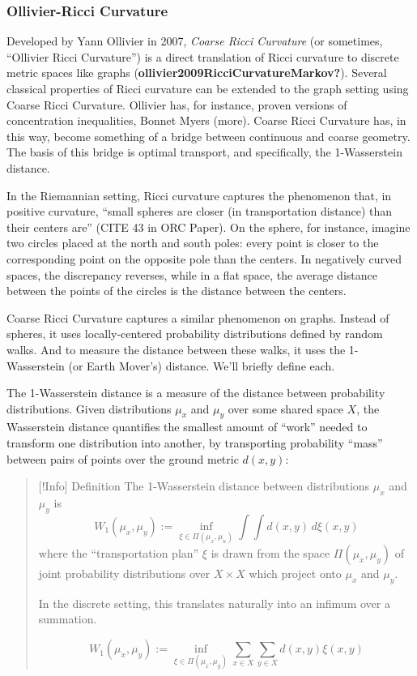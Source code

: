 \documentclass[
  letterpaper,
  DIV=11,
  numbers=noendperiod]{scrartcl}
\begin{document}
\subsubsection{Ollivier-Ricci Curvature}\label{ollivier-ricci-curvature}

Developed by Yann Ollivier in 2007, \emph{Coarse Ricci Curvature} (or
sometimes, ``Ollivier Ricci Curvature'') is a direct translation of
Ricci curvature to discrete metric spaces like graphs
(\textbf{ollivier2009RicciCurvatureMarkov?}). Several classical
properties of Ricci curvature can be extended to the graph setting using
Coarse Ricci Curvature. Ollivier has, for instance, proven versions of
concentration inequalities, Bonnet Myers (more). Coarse Ricci Curvature
has, in this way, become something of a bridge between continuous and
coarse geometry. The basis of this bridge is optimal transport, and
specifically, the 1-Wasserstein distance.

In the Riemannian setting, Ricci curvature captures the phenomenon that,
in positive curvature, ``small spheres are closer (in transportation
distance) than their centers are'' (CITE 43 in ORC Paper). On the
sphere, for instance, imagine two circles placed at the north and south
poles: every point is closer to the corresponding point on the opposite
pole than the centers. In negatively curved spaces, the discrepancy
reverses, while in a flat space, the average distance between the points
of the circles is the distance between the centers.

Coarse Ricci Curvature captures a similar phenomenon on graphs. Instead
of spheres, it uses locally-centered probability distributions defined
by random walks. And to measure the distance between these walks, it
uses the 1-Wasserstein (or Earth Mover's) distance. We'll briefly define
each.

The 1-Wasserstein distance is a measure of the distance between
probability distributions. Given distributions \(\mu_{x}\) and
\(\mu_{y}\) over some shared space \(X\), the Wasserstein distance
quantifies the smallest amount of ``work'' needed to transform one
distribution into another, by transporting probability ``mass'' between
pairs of points over the ground metric \(d(x,y)\):

\begin{quote}
{[}!Info{]} Definition The 1-Wasserstein distance between distributions
\(\mu_{x}\) and \(\mu_{y}\) is
\[ W_{1}(\mu_{x},\mu_{y}) := \inf_{\xi \in \Pi(\mu_{x},\mu_{u})} \int \int d(x,y) \, d\xi(x,y) \]
where the ``transportation plan'' \(\xi\) is drawn from the space
\(\Pi(\mu_{x},\mu_{y})\) of joint probability distributions over
\(X \times X\) which project onto \(\mu_{x}\) and \(\mu_{y}\).

In the discrete setting, this translates naturally into an infimum over
a summation.

\[W_{1}(\mu_{x},\mu_{y}) := \inf_{\xi \in \Pi(\mu_{x},\mu_{y})} \sum_{x \in X} \sum_{y \in X} d(x,y) \xi(x,y)\]
\end{quote}
\end{document}
